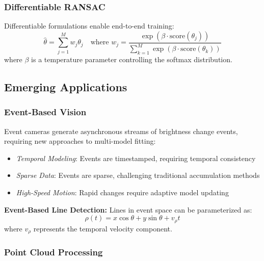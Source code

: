 \documentclass[12pt]{article}
\begin{document}
\subsubsection{Differentiable RANSAC}
\label{subsubsec:differentiable_ransac}

Differentiable formulations enable end-to-end training:
\begin{equation}
    \hat{\theta} = \sum_{j=1}^M w_j \theta_j \quad \text{where } w_j = \frac{\exp(\beta \cdot \text{score}(\theta_j))}{\sum_{k=1}^M \exp(\beta \cdot \text{score}(\theta_k))}
    \label{eq:differentiable_ransac}
\end{equation}
where $\beta$ is a temperature parameter controlling the softmax distribution.

\subsection{Emerging Applications}
\label{subsec:emerging_applications}

\subsubsection{Event-Based Vision}
\label{subsubsec:event_based_vision}

Event cameras generate asynchronous streams of brightness change events, requiring new approaches to multi-model fitting:

\begin{itemize}
    \item \textit{Temporal Modeling}: Events are timestamped, requiring temporal consistency
    \item \textit{Sparse Data}: Events are sparse, challenging traditional accumulation methods
    \item \textit{High-Speed Motion}: Rapid changes require adaptive model updating
\end{itemize}

\textbf{Event-Based Line Detection:} Lines in event space can be parameterized as:
\begin{equation}
    \rho(t) = x \cos \theta + y \sin \theta + v_\rho t
    \label{eq:event_line_param}
\end{equation}
where $v_\rho$ represents the temporal velocity component.

\subsubsection{Point Cloud Processing}
\label{subsubsec:point_cloud_processing}
\end{document}
